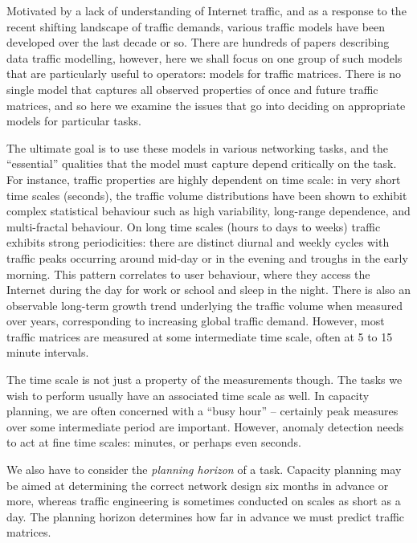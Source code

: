 Motivated by a lack of understanding of Internet traffic, and as a
response to the recent shifting landscape of traffic demands, various
traffic models have been developed over the last decade or so. There
are hundreds of papers describing data traffic modelling, however,
here we shall focus on one group of such models that are particularly
useful to operators: models for traffic matrices. There is no single
model that captures all observed properties of once and future traffic
matrices, and so here we examine the issues that go into deciding on
appropriate models for particular tasks.


The ultimate goal is to use these models in various networking
tasks, and the ``essential'' qualities that the model must capture
depend critically on the task. For instance, traffic properties are
highly dependent on time scale: in very short time scales (seconds), 
the traffic volume distributions have been shown to exhibit
complex statistical behaviour such as high variability, long-range
dependence, and multi-fractal behaviour. On long time scales (hours to
days to weeks) traffic exhibits strong periodicities: there are
distinct diurnal and weekly cycles with traffic peaks occurring around
mid-day or in the evening and troughs in the early morning.  This
pattern correlates to user behaviour, where they access the Internet
during the day for work or school and sleep in the night. There is
also an observable long-term growth trend underlying the traffic
volume when measured over years, corresponding to increasing global
traffic demand. However, most traffic matrices are measured at some
intermediate time scale, often at 5 to 15 minute intervals.

The time scale is not just a property of the measurements though. The
tasks we wish to perform usually have an associated time scale as
well. In capacity planning, we are often concerned with a ``busy
hour'' -- certainly peak measures over some intermediate period are
important. However, anomaly detection needs to act at fine time
scales: minutes, or perhaps even seconds.

We also have to consider the {\em planning horizon} of a
task. Capacity planning may be aimed at determining the correct
network design six months in advance or more, whereas traffic
engineering is sometimes conducted on scales as short as a day. The
planning horizon determines how far in advance we must predict traffic
matrices. 

